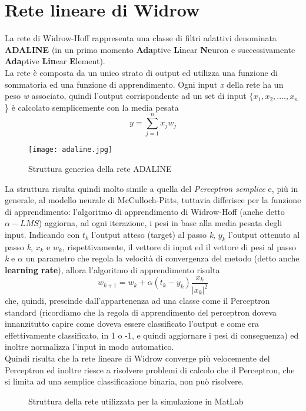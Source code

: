 	\section{Rete lineare di Widrow}
		La rete di Widrow-Hoff rappresenta una classe di filtri adattivi denominata \textbf{ADALINE} (in un primo momento \textbf{Ada}ptive \textbf{Li}near \textbf{Ne}uron e successivamente \textbf{Ada}ptive \textbf{Lin}ear \textbf{E}lement).\\
		La rete è composta da un unico strato di output ed utilizza una funzione di sommatoria ed una funzione di apprendimento. Ogni input \textit{x} della rete ha un peso \textit{w} associato, quindi l'output corrispondente ad un set di input \(\{x_1, x_2, ...., x_n\)\} è calcolato semplicemente con la media pesata
		\[y = \sum_{j=1}^{n} x_j w_j\]
		\begin{figure}[h]
			\centering
			\texttt{[image: adaline.jpg]}
			\caption{Struttura generica della rete ADALINE}
		\end{figure}
		La struttura risulta quindi molto simile a quella del \textit{Perceptron semplice} e, più in generale, al modello neurale di McCulloch-Pitts, tuttavia differisce per la funzione di apprendimento: l'algoritmo di apprendimento di Widrow-Hoff (anche detto \textbf{\(\alpha-LMS\)}) aggiorna, ad ogni iterazione, i pesi in base alla media pesata degli input. Indicando con \(\textit{t}_k\) l'output atteso (target) al passo \textit{k}, \(\textit{y}_k\) l'output ottenuto al passo \textit{k}, \(\textit{x}_k\) e \(\textit{w}_k\), rispettivamente, il vettore di input ed il vettore di pesi al passo \textit{k} e \textit{\(\alpha\)} un parametro che regola la velocità di convergenza del metodo (detto anche \textbf{learning rate}), allora l'algoritmo di apprendimento risulta
		\[w_{k+1} = w_k + \alpha(t_k - y_k)\frac{x_k}{|x_k|^2}\]
		che, quindi, prescinde dall'appartenenza ad una classe come il Perceptron standard (ricordiamo che la regola di apprendimento del perceptron doveva innanzitutto capire come doveva essere classificato l'output e come era effettivamente classificato, in 1 o -1, e quindi aggiornare i pesi di conseguenza) ed inoltre normalizza l'input in modo automatico.\\
		Quindi risulta che la rete lineare di Widrow converge più velocemente del Perceptron ed inoltre  riesce a risolvere problemi di calcolo che il Perceptron, che si limita ad una semplice classificazione binaria, non può risolvere.\\
		\begin{figure}[h]
			\begin{center}
				\setlength\fboxsep{0pt}
				\setlength\fboxrule{2pt}
			\end{center}
			\caption{Struttura della rete utilizzata per la simulazione in MatLab}
		\end{figure}\\
